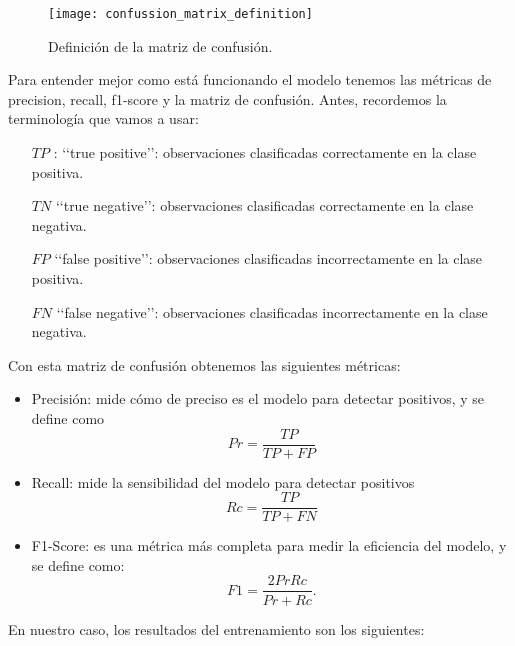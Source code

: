 \begin{wrapfigure}[14]{L}{0.5\textwidth}
\texttt{[image: confussion\_matrix\_definition]}
\caption{Definición de la matriz de confusión.}\label{fig:confussion_matrix_definition}
\end{wrapfigure} 

Para entender mejor como está funcionando el modelo  tenemos las métricas de precision, recall, f1-score y la matriz de confusión. Antes, recordemos la terminología que vamos a usar:
\begin{itemize}
\item[$TP$]: \lq\lq true positive\rq\rq: observaciones clasificadas correctamente en la clase positiva.
\item[$TN$] \lq\lq true negative\rq\rq: observaciones clasificadas correctamente en la clase negativa.
\item[$FP$] \lq\lq false positive\rq\rq: observaciones clasificadas incorrectamente en la clase positiva.
\item[$FN$] \lq\lq false negative\rq\rq: observaciones clasificadas incorrectamente en la clase negativa.	 
\end{itemize}
Con esta matriz de confusión obtenemos las siguientes métricas:
\begin{itemize}
\item Precisión: mide cómo de preciso es el modelo para detectar positivos, y se define como
$$Pr = \frac{TP}{TP + FP}$$ 

\item Recall: mide la sensibilidad del modelo para detectar positivos 	
$$Rc = \frac{TP}{TP + FN}$$ 
\item F1-Score: es una métrica más completa para medir la eficiencia del modelo, y se define como:
$$F1 = \frac{2Pr Rc}{Pr+Rc}.$$ 
\end{itemize}

En nuestro caso, los resultados del entrenamiento son los siguientes:

